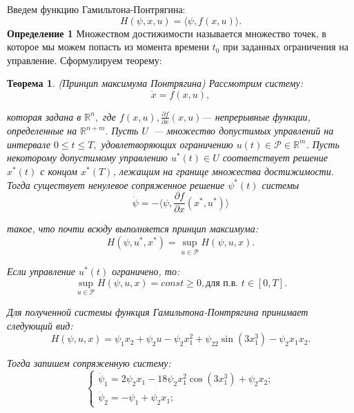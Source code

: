 \documentclass[11pt]{article}
\begin{document}
	{Введем функцию Гамильтона-Понтрягина: }
	\begin{equation}
	H(\psi, x, u) = \langle \psi, f(x,u) \rangle.
	\end{equation}
	{\textbf{Определение 1} Множеством достижимости называется множество точек, в которое мы можем попасть из момента времени $t_0$ при заданных ограничения на управление.}
	\newline
 	{Сформулируем теорему:}
 	\newtheorem{theorem}{Теорема}
 	\begin{theorem}
 		{(Принцип максимума Понтрягина) Рассмотрим систему:}
 		\begin{equation}
 		\dot x = f(x,u),
 		\end{equation}
 		
 		{которая задана в $\mathbb{R}^n,$ где $f(x,u), \frac{\partial f}{\partial x}(x,u)$--- непрерывные функции, определенные на $\mathbb{R}^{n + m}.$ Пусть $U$~--- множество допустимых управлений на интервале $0 \leq t \leq T,$ удовлетворяющих ограничению $u(t) \in \mathcal{P} \in \mathbb{R}^m$. Пусть некоторому допустимому управлению $u^*(t) \in U$ соответствует решение $x^*(t)$ с концом $x^*(T)$, лежащим на границе множества достижимости. Тогда существует ненулевое сопряженное решение $\psi^*(t)$ системы}
 		\begin{equation}
 		 \dot \psi = - \langle \psi, \frac{\partial f}{\partial x}(x^*,u^*) \rangle
 		\end{equation}
 		
 		{такое, что почти всюду выполняется принцип максимума:}
 		\begin{equation}
 			H(\psi, u^*, x^*) = \sup \limits_{u \in \mathcal{P}} H(\psi, u, x).
 		\end{equation}
 		
 		{Если управление $u^*(t)$ ограничено, то:}
 		\begin{equation}
 			\sup \limits_{u \in \mathcal{P}}H(\psi, u, x) = const \geq 0, \text{для п.в. } t \in [0, T].
 		\end{equation}
 		
 		{Для полученной системы функция Гамильтона-Понтрягина принимает следующий вид:}
 		\begin{equation}
 			H(\psi, u , x) = \psi_1x_2 + \psi_2u - \psi_2x_1^2 + \psi_22\sin(3x_1^3) - \psi_2x_1x_2.
 		\end{equation}
 		
 		{Тогда запишем сопряженную систему:}
 		\begin{equation}
 		 \begin{cases}
 		\dot \psi_1 = 2\psi_2x_1 -18\psi_2x_1^2\cos(3x_1^3) + \psi_2x_2;\\
 		\dot \psi_2 = -\psi_1 + \psi_2x_1;
 		\end{cases}
 		\end{equation}
 		
 	\end{theorem}
\end{document}
